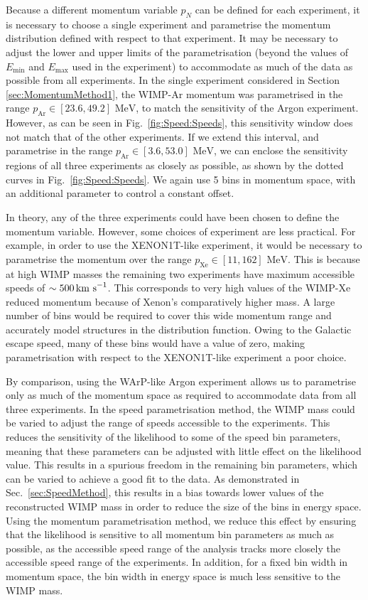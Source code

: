 Because a different momentum variable \(p_N\) can be defined for each experiment, it is necessary to choose a single experiment and parametrise the momentum distribution defined with respect to that experiment. It may be necessary to adjust the lower and upper limits of the parametrisation (beyond the values of \(E_\textrm{min}\) and \(E_\textrm{max}\) used in the experiment) to accommodate as much of the data as possible from all experiments. In the single experiment considered in Section \ref{sec:MomentumMethod1}, the WIMP-Ar momentum was parametrised in the range \(p_\textrm{Ar} \in \left[23.6, 49.2\right] \textrm{ MeV}\), to match the sensitivity of the Argon experiment. However, as can be seen in Fig.\ \ref{fig:Speed:Speeds}, this sensitivity window does not match that of the other experiments. If we extend this interval, and parametrise in the range \(p_\textrm{Ar} \in \left[3.6, 53.0\right] \textrm{ MeV}\), we can enclose the sensitivity regions of all three experiments as closely as possible, as shown by the dotted curves in Fig.\ \ref{fig:Speed:Speeds}. We again use 5 bins in momentum space, with an additional parameter to control a constant offset.

In theory, any of the three experiments could have been chosen to define the momentum variable. However, some choices of experiment are less practical. For example, in order to use the XENON1T-like experiment, it would be necessary to parametrise the momentum over the range \(p_\textrm{Xe} \in \left[11 , 162\right] \textrm{ MeV}\). This is because at high WIMP masses the remaining two experiments have maximum accessible speeds of \(\sim 500 \,\textrm{km s}^{-1}\). This corresponds to very high values of the WIMP-Xe reduced momentum because of Xenon's comparatively higher mass. A large number of bins would be required to cover this wide momentum range and accurately model structures in the distribution function. Owing to the Galactic escape speed, many of these bins would have a value of zero, making parametrisation with respect to the XENON1T-like experiment a poor choice.

By comparison, using the WArP-like Argon experiment allows us to parametrise only as much of the momentum space as required to accommodate data from all three experiments. In the speed parametrisation method, the WIMP mass could be varied to adjust the range of speeds accessible to the experiments. This reduces the sensitivity of the likelihood to some of the speed bin parameters, meaning that these parameters can be adjusted with little effect on the likelihood value. This results in a spurious freedom in the remaining bin parameters, which can be varied to achieve a good fit to the data. As demonstrated in Sec.\ \ref{sec:SpeedMethod}, this results in a bias towards lower values of the reconstructed WIMP mass in order to reduce the size of the bins in energy space. Using the momentum parametrisation method, we reduce this effect by ensuring that the likelihood is sensitive to all momentum bin parameters as much as possible, as the accessible speed range of the analysis tracks more closely the accessible speed range of the experiments. In addition, for a fixed bin width in momentum space, the bin width in energy space is much less sensitive to the WIMP mass.

